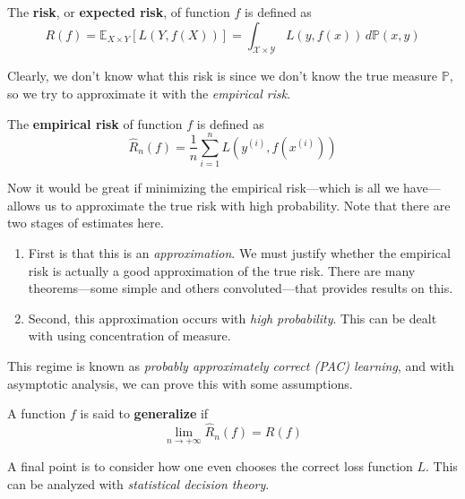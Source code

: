 \begin{definition}[Risk]
  The \textbf{risk}, or \textbf{expected risk}, of function $f$ is defined as 
  \begin{equation}
    R(f) = \mathbb{E}_{X \times Y} [ L(Y, f(X))] = \int_{\mathcal{X} \times \mathcal{Y}} L(y, f(x)) \,d\mathbb{P}(x, y)
  \end{equation}
\end{definition}

Clearly, we don't know what this risk is since we don't know the true measure $\mathbb{P}$, so we try to approximate it with the \textit{empirical risk}. 

\begin{definition}
  The \textbf{empirical risk} of function $f$ is defined as 
  \begin{equation}
    \hat{R}_n(f) = \frac{1}{n} \sum_{i=1}^n L(y^{(i)}, f(x^{(i)}))
  \end{equation}
\end{definition}

Now it would be great if minimizing the empirical risk---which is all we have---allows us to approximate the true risk with high probability. Note that there are two stages of estimates here. 
\begin{enumerate}
  \item First is that this is an \textit{approximation}. We must justify whether the empirical risk is actually a good approximation of the true risk. There are many theorems---some simple and others convoluted---that provides results on this. 
  \item Second, this approximation occurs with \textit{high probability}. This can be dealt with using concentration of measure. 
\end{enumerate}
This regime is known as \textit{probably approximately correct (PAC) learning}, and with asymptotic analysis, we can prove this with some assumptions. 

\begin{definition}[Generalize]
  A function $f$ is said to \textbf{generalize} if 
  \begin{equation}
    \lim_{n \rightarrow +\infty} \hat{R}_n (f) = R(f)
  \end{equation}
\end{definition}

A final point is to consider how one even chooses the correct loss function $L$. This can be analyzed with \textit{statistical decision theory}. 

